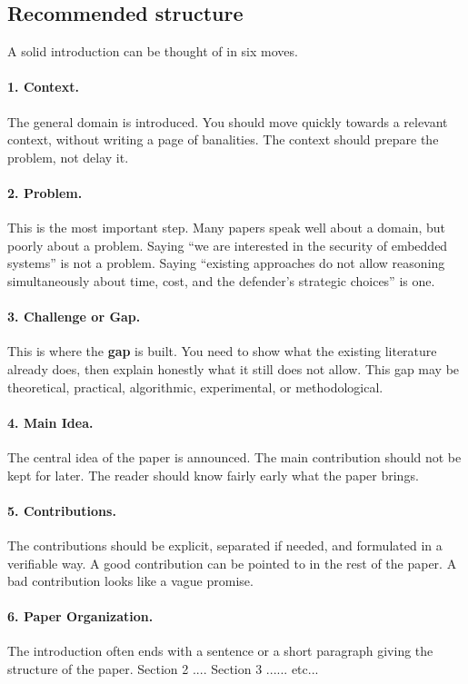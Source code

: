 \documentclass[11pt,a4paper]{article}
\theoremstyle{definition}
\begin{document}
\subsection*{Recommended structure}

A solid introduction can be thought of in six moves.

\paragraph{1. Context.}
The general domain is introduced. You should move quickly towards a relevant context, without writing a page of banalities. The context should prepare the problem, not delay it.

\paragraph{2. Problem.}
This is the most important step. Many papers speak well about a domain, but poorly about a problem. Saying ``we are interested in the security of embedded systems'' is not a problem. Saying ``existing approaches do not allow reasoning simultaneously about time, cost, and the defender's strategic choices'' is one.

\paragraph{3. Challenge or Gap.}
This is where the \textbf{gap} is built. You need to show what the existing literature already does, then explain honestly what it still does not allow. This gap may be theoretical, practical, algorithmic, experimental, or methodological.

\paragraph{4. Main Idea.}
The central idea of the paper is announced. The main contribution should not be kept for later. The reader should know fairly early what the paper brings.

\paragraph{5. Contributions.}
The contributions should be explicit, separated if needed, and formulated in a verifiable way. A good contribution can be pointed to in the rest of the paper. A bad contribution looks like a vague promise.

\paragraph{6. Paper Organization.}
The introduction often ends with a sentence or a short paragraph giving the structure of the paper. Section 2 .... Section 3 ...... etc...
\end{document}
